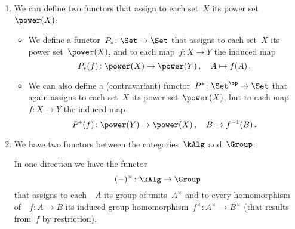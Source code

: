 \begin{example}
  \label{examples for functors}
  \leavevmode
  \begin{enumerate}
    \item
      We can define two functors that assign to each set~$X$ its power set~$\power(X)$:
      \begin{itemize}
        \item
          We define a functor~$P_* \colon \Set \to \Set$ that assigns to each set~$X$ its power set~$\power(X)$, and to each map~$f \colon X \to Y$ the induced map
          \[
                    P_*(f)
            \colon  \power(X)
            \to     \power(Y) \,,
            \quad   A
            \mapsto f(A) \,.
          \]
        \item
          We can also define a (contravariant) functor~$P^* \colon \Set^\op \to \Set$ that again assigns to each set~$X$ its power set~$\power(X)$, but to each map~$f \colon X \to Y$ the induced map
          \[
                    P^*(f)
            \colon  \power(Y)
            \to     \power(X) \,,
            \quad   B
            \mapsto f^{-1}(B) \,.
          \]
      \end{itemize}
    \item
      We have two functors between the categories~$\kAlg$ and~$\Group$:
      
      In one direction we have the functor
      \[
                (-)^\times
        \colon  \kAlg
        \to     \Group
      \]
      that assigns to each~{\kalg}~$A$ its group of units~$A^\times$ and to every homomorphism of~{\kalgs}~$f \colon A \to B$ its induced group homomorphism~$f^\times \colon A^\times \to B^\times$ (that results from~$f$ by restriction).
      

\end{enumerate}
\end{example}
